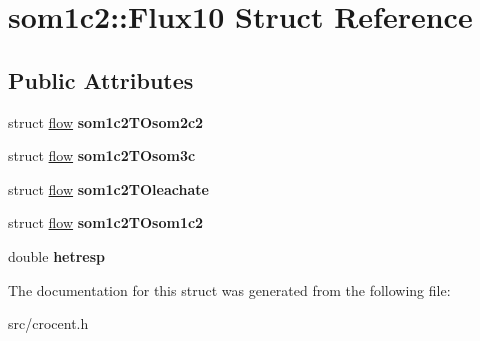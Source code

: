 \hypertarget{structsom1c2_1_1_flux10}{\section{som1c2\-:\-:Flux10 Struct Reference}
\label{structsom1c2_1_1_flux10}
}
\subsection*{Public Attributes}
\begin{DoxyCompactItemize}
\item 
\hypertarget{structsom1c2_1_1_flux10_a0a3ff66fc8d2e1d58f6922a8e0a1d55f}{struct \hyperlink{structflow}{flow} {\bfseries som1c2\-T\-Osom2c2}}\label{structsom1c2_1_1_flux10_a0a3ff66fc8d2e1d58f6922a8e0a1d55f}

\item 
\hypertarget{structsom1c2_1_1_flux10_a2b2067c0ddc05ea2028cd907c6ed4122}{struct \hyperlink{structflow}{flow} {\bfseries som1c2\-T\-Osom3c}}\label{structsom1c2_1_1_flux10_a2b2067c0ddc05ea2028cd907c6ed4122}

\item 
\hypertarget{structsom1c2_1_1_flux10_ab66a1f9f0a16148b48dce7d89758738d}{struct \hyperlink{structflow}{flow} {\bfseries som1c2\-T\-Oleachate}}\label{structsom1c2_1_1_flux10_ab66a1f9f0a16148b48dce7d89758738d}

\item 
\hypertarget{structsom1c2_1_1_flux10_a4d6c98df13149af996a7abeaa64d064e}{struct \hyperlink{structflow}{flow} {\bfseries som1c2\-T\-Osom1c2}}\label{structsom1c2_1_1_flux10_a4d6c98df13149af996a7abeaa64d064e}

\item 
\hypertarget{structsom1c2_1_1_flux10_ab8bf99cbfb8b24f0ef212423e14825bb}{double {\bfseries hetresp}}\label{structsom1c2_1_1_flux10_ab8bf99cbfb8b24f0ef212423e14825bb}

\end{DoxyCompactItemize}


The documentation for this struct was generated from the following file\-:\begin{DoxyCompactItemize}
\item 
src/crocent.\-h\end{DoxyCompactItemize}
